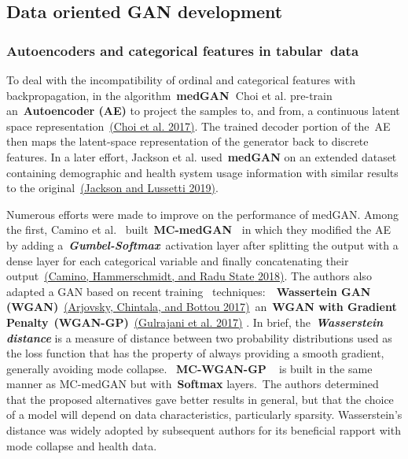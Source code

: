 \documentclass[10pt]{article}
\begin{document}
\subsection{Data oriented GAN
development}

\subsubsection{Autoencoders and categorical features in
tabular~data}

{\label{761000}}

To deal with the incompatibility of ordinal and categorical features
with backpropagation, in the algorithm~\textbf{medGAN\emph{~}}Choi et
al. pre-train an~\textbf{Autoencoder (AE)} to project the samples to,
and from, a continuous latent space representation~\hyperref[csl:31]{(Choi et al. 2017)}.
The trained decoder portion of the~AE then maps the latent-space
representation of the generator back to discrete features. In a later
effort, Jackson et al. used~\textbf{medGAN} on an extended dataset
containing demographic and health system usage information with similar
results to the original~\hyperref[csl:23]{(Jackson and Lussetti 2019)}. ~

Numerous efforts were made to improve on the performance of medGAN.
Among the first, Camino et al.~ built~\textbf{MC-medGAN~} in which they
modified the AE by adding a~\textbf{\emph{Gumbel-Softmax}}~activation
layer after splitting the output with a dense layer for each categorical
variable and finally concatenating their output~\hyperref[csl:22]{(Camino, Hammerschmidt, and {Radu State} 2018)}. The
authors also adapted a GAN based on recent training~
techniques:~~\textbf{Wassertein GAN
(WGAN)}~\hyperref[csl:42]{(Arjovsky, Chintala, and Bottou 2017)}~an~\textbf{WGAN with Gradient
Penalty}~\textbf{(WGAN-GP)}~\hyperref[csl:43]{(Gulrajani et al. 2017)} . In brief,
the~\textbf{\emph{Wasserstein distance}} is a measure of distance
between two probability distributions used as the loss function that has
the property of always providing a smooth gradient, generally avoiding
mode collapse.~ \textbf{MC-WGAN-GP~~}is built in the same manner as
MC-medGAN but with~\textbf{Softmax} layers.~The authors determined that
the proposed alternatives gave better results in general, but that the
choice of a model will depend on data characteristics, particularly
sparsity. Wasserstein's distance was widely adopted by subsequent
authors for its beneficial rapport with mode collapse and health data.~
\end{document}

